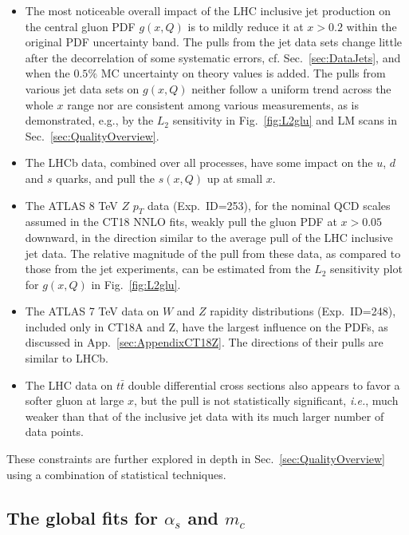 \begin{itemize}

\item The most noticeable overall impact of the LHC inclusive jet
  production on the central gluon PDF $g(x,Q)$ is to mildly reduce it
  at $x > 0.2$ within the original PDF uncertainty band. The pulls
  from the jet data sets change little after the decorrelation of some
  systematic errors, cf. Sec.~\ref{sec:DataJets},
  and when the $0.5\%$ MC uncertainty on theory values is added.
The pulls from various jet data sets on $g(x,Q)$ neither follow a
uniform trend across the whole $x$ range nor are consistent among
various measurements, as is demonstrated, e.g., by the $L_2$
sensitivity in Fig.~\ref{fig:L2glu} and LM scans in
Sec.~\ref{sec:QualityOverview}. 

\item The LHCb data, combined over all processes, have some impact on
  the $u$, $d$ and $s$ quarks, and pull the $s (x,Q)$ up at small $x$.   

\item The ATLAS 8 TeV $Z$ $p_T$ data (Exp.~ID=253), for the nominal
  QCD scales assumed in the CT18 NNLO fits, weakly pull the gluon PDF
  at $x>0.05$ downward, in the direction similar to the average pull
  of the LHC inclusive jet data. The relative magnitude of the pull
  from these data, as compared to those from the jet experiments,
  can be estimated from the $L_2$ sensitivity plot
  for $g(x,Q)$ in Fig.~\ref{fig:L2glu}.

\item The ATLAS 7 TeV data on $W$ and $Z$ rapidity distributions
  (Exp.~ID=248), included only in CT18A and Z, have the largest
  influence on the PDFs, as discussed in
  App.~\ref{sec:AppendixCT18Z}. The directions of their pulls are
  similar to LHCb. 

\item The LHC data on $t \bar t$ double differential cross sections
  also appears to favor a softer gluon at large $x$, but the pull is
  not statistically significant, {\it i.e.}, much weaker than that of
  the inclusive jet data with its much larger number of data points.  

\end{itemize}

These constraints are further explored in depth in
Sec.~\ref{sec:QualityOverview} using a combination of statistical techniques.

\subsection{The global fits for $\alpha_s$ and $m_c$}
\label{sec:AlphasDependence}


